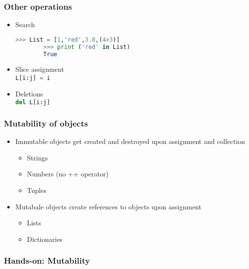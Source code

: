 \documentclass[xcolor=table,10pt,final]{beamer}
\begin{document}
\begin{frame}[fragile]
  \frametitle{Other operations}
  \begin{itemize}
    \item Search\\
      \begin{lstlisting}[language=python]
        >>> List = [1,'red',3.0,(4>3)]
        >>> print ('red' in List)
        True
      \end{lstlisting}
    \item Slice assignment\\
      \lstinline[language=python]|L[i:j] = i|
    \item Deletions\\
      \lstinline[language=python]|del L[i:j]|
  \end{itemize}

\end{frame}

\begin{frame}[fragile]
  \frametitle{Mutability of objects}
  \begin{itemize}
    \item Immutable objects get created and destroyed upon assignment and collection
      \begin{itemize}
        \item Strings
        \item Numbers (no ++ operator)
        \item Tuples
      \end{itemize}
    \item Mutabale objects create references to objects upon assignment
      \begin{itemize}
        \item Lists
        \item Dictionaries
      \end{itemize}
  \end{itemize}
\end{frame}

\begin{frame}
  \frametitle{Hands-on: Mutability}
\end{frame}
\end{document}
